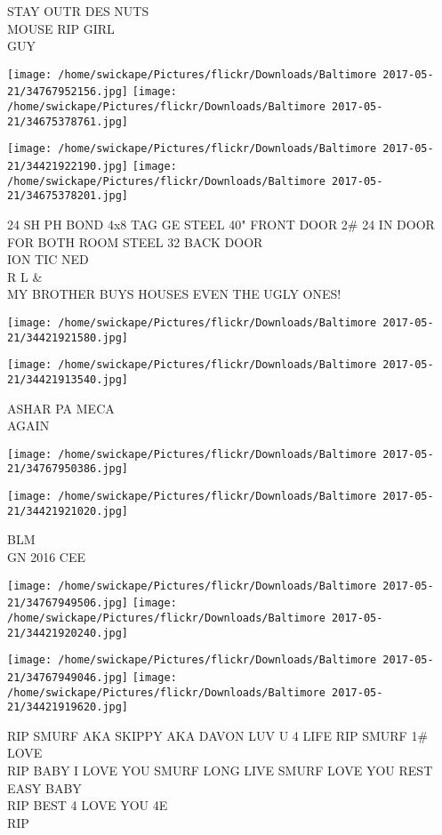 \documentclass[10pt,letterpaper]{article}
\begin{document}
STAY OUTR DES NUTS\\
MOUSE RIP GIRL\\
GUY
\pagebreak

\texttt{[image: /home/swickape/Pictures/flickr/Downloads/Baltimore 2017-05-21/34767952156.jpg]}
\texttt{[image: /home/swickape/Pictures/flickr/Downloads/Baltimore 2017-05-21/34675378761.jpg]}

\texttt{[image: /home/swickape/Pictures/flickr/Downloads/Baltimore 2017-05-21/34421922190.jpg]}
\texttt{[image: /home/swickape/Pictures/flickr/Downloads/Baltimore 2017-05-21/34675378201.jpg]}

24 SH PH BOND 4x8 TAG GE STEEL 40" FRONT DOOR 2\# 24 IN DOOR FOR BOTH ROOM STEEL 32 BACK DOOR\\
ION TIC NED\\
R L \&\\
MY BROTHER BUYS HOUSES EVEN THE UGLY ONES!
\pagebreak

\texttt{[image: /home/swickape/Pictures/flickr/Downloads/Baltimore 2017-05-21/34421921580.jpg]}

\vspace{0.25in}
\texttt{[image: /home/swickape/Pictures/flickr/Downloads/Baltimore 2017-05-21/34421913540.jpg]}

ASHAR PA MECA\\
AGAIN
\pagebreak

\texttt{[image: /home/swickape/Pictures/flickr/Downloads/Baltimore 2017-05-21/34767950386.jpg]}

\vspace{0.25in}
\texttt{[image: /home/swickape/Pictures/flickr/Downloads/Baltimore 2017-05-21/34421921020.jpg]}

BLM\\
GN 2016 CEE
\pagebreak

\texttt{[image: /home/swickape/Pictures/flickr/Downloads/Baltimore 2017-05-21/34767949506.jpg]}
\texttt{[image: /home/swickape/Pictures/flickr/Downloads/Baltimore 2017-05-21/34421920240.jpg]}

\texttt{[image: /home/swickape/Pictures/flickr/Downloads/Baltimore 2017-05-21/34767949046.jpg]}
\texttt{[image: /home/swickape/Pictures/flickr/Downloads/Baltimore 2017-05-21/34421919620.jpg]}

RIP SMURF AKA SKIPPY AKA DAVON LUV U 4 LIFE RIP SMURF 1\# LOVE\\
RIP BABY I LOVE YOU SMURF LONG LIVE SMURF LOVE YOU REST EASY BABY\\
RIP BEST 4 LOVE YOU 4E\\
RIP
\pagebreak
\end{document}
